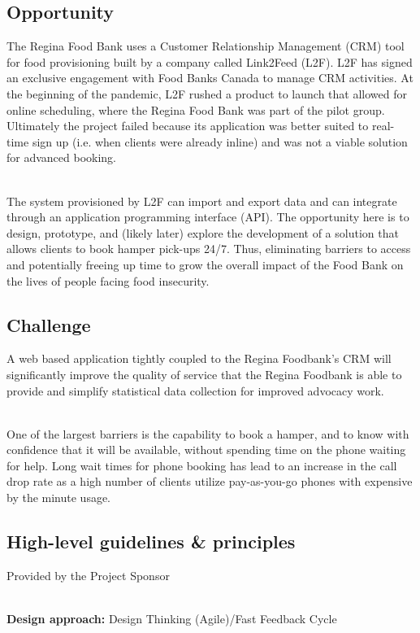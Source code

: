 \documentclass[english,course]{lecture}
\begin{document}
\subsection{Opportunity}
The Regina Food Bank uses a Customer Relationship Management (CRM) tool for food provisioning built by a company called Link2Feed (L2F). L2F has signed an exclusive engagement with Food Banks Canada to manage CRM activities. At the beginning of the pandemic, L2F rushed a product to launch that allowed for online scheduling, where the Regina Food Bank was part of the pilot group. Ultimately the project failed because its application was better suited to real-time sign up (i.e. when clients were already inline) and was not a viable solution for advanced booking.

\\The system provisioned by L2F can import and export data and can integrate through an application programming interface (API). The opportunity here is to design, prototype, and (likely later) explore the development of a solution that allows clients to book hamper pick-ups 24/7. Thus, eliminating barriers to access and potentially freeing up time to grow the overall impact of the Food Bank on the lives of people facing food insecurity.

\subsection{Challenge}
A web based application tightly coupled to the Regina Foodbank's CRM will significantly improve the quality of service that the Regina Foodbank is able to provide and simplify statistical data collection for improved advocacy work.

\\One of the largest barriers is the capability to book a hamper, and to know with confidence that it will be available, without spending time on the phone waiting for help. Long wait times for phone booking has lead to an increase in the call drop rate as a high number of clients utilize pay-as-you-go phones with expensive by the minute usage.

\subsection{High-level guidelines \& principles}
Provided by the Project Sponsor

\\\textbf{Design approach:} Design Thinking (Agile)/Fast Feedback Cycle
\end{document}
